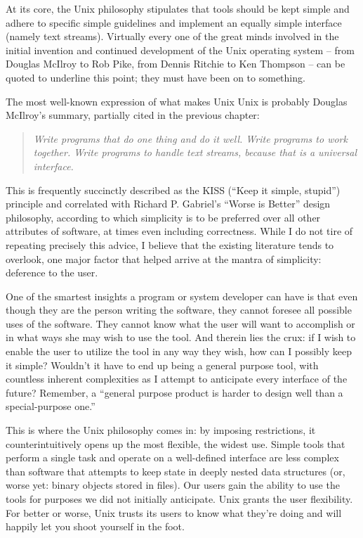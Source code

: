 At its core, the  Unix
philosophy stipulates that
tools should be kept simple and adhere to specific
simple guidelines and implement an equally simple
interface (namely text streams).  Virtually every one
of the great minds involved in the initial invention
and continued development of the Unix operating
system -- from Douglas McIlroy to Rob Pike, from
Dennis Ritchie to Ken Thompson -- can be quoted to
underline this point; they must have been on to
something.

The most well-known expression of what makes Unix Unix
is probably Douglas McIlroy's
summary\cite{history:mcilroy-unix-philosophy},
partially cited in the previous chapter:

\begin{quote}
{\em Write programs that do one thing and do it well. Write programs to work
together. Write programs to handle text streams, because that is a
universal interface.}
\end{quote}

This is frequently succinctly described as the KISS
(``Keep it simple, stupid'') principle and correlated
with Richard P. Gabriel's ``Worse is Better''\cite{history:gabriel-worse-is-better} design
philosophy, according to which simplicity is to be
preferred over all other attributes of software, at
times even including correctness.  While I do not tire
of repeating precisely this advice, I believe that the
existing literature tends to overlook, one major
factor that helped arrive at the mantra of simplicity:
deference to the user.

One of the smartest insights a program or system
developer can have is that even though they are the
person writing the software, they cannot foresee all
possible uses of the software.  They cannot know what
the user will want to accomplish or in what ways she
may wish to use the tool.  And therein lies the crux:
if I wish to enable the user to utilize the tool in
any way they wish, how can I possibly keep it simple?
Wouldn't it have to end up being a general purpose
tool, with countless inherent complexities as I
attempt to anticipate every interface of the future?
Remember, a ``general purpose product is harder to
design well than a special-purpose
one.''\cite{history:brooks-design}

This is where the Unix philosophy comes in: by
imposing restrictions, it counterintuitively opens up
the most flexible, the widest use.  Simple tools that
perform a single task and operate on a well-defined
interface are less complex than software that attempts
to keep state in deeply nested data structures (or,
worse yet: binary objects stored in files).  Our users
gain the ability to use the tools for purposes we did
not initially anticipate.  Unix grants the user
flexibility.  For  better or worse, Unix trusts its
users to know what they're doing and will happily let
you shoot yourself in the foot.

